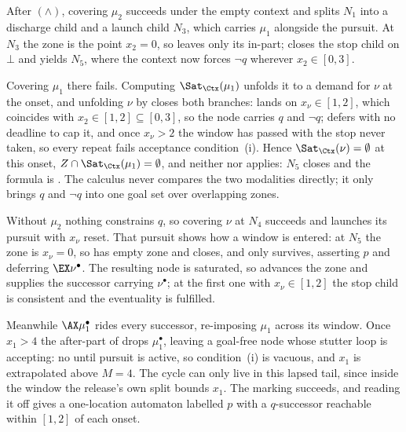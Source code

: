 \begin{example}[$\mu_1\wedge\mu_2$]\label{ex:unsat}
After $(\wedge)$, covering $\mu_2$ succeeds under the empty context and splits $N_1$
into a discharge child and a launch child $N_3$, which carries $\mu_1$ alongside the
pursuit. At $N_3$ the zone is the point $x_2{=}0$, so  leaves only its
in-part;  closes the stop child on $\bot$ and yields $N_5$, where the
context now forces $\neg q$ wherever $x_2\in[0,3]$.

Covering $\mu_1$ there fails. Computing $\Sat_\Ctx(\mu_1)$ unfolds it to a demand for
$\nu$ at the onset, and unfolding $\nu$ by  closes both branches:
 lands on $x_\nu\in[1,2]$, which coincides with $x_2\in[1,2]\subseteq[0,3]$,
so the node carries $q$ and $\neg q$;  defers with no deadline to cap it, and
once $x_\nu>2$ the window has passed with the stop never taken, so every repeat fails
acceptance condition~(i). Hence $\Sat_\Ctx(\nu)=\emptyset$ at this onset,
$Z\cap\Sat_\Ctx(\mu_1)=\emptyset$, and neither  nor  applies:
$N_5$ closes and the formula is \UNSAT. The calculus never compares the two modalities
directly; it only brings $q$ and $\neg q$ into one goal set over overlapping zones.
\end{example}

\begin{example}[$\mu_1$ alone]\label{ex:sat}
Without $\mu_2$ nothing constrains $q$, so covering $\nu$ at $N_4$ succeeds and launches
its pursuit with $x_\nu$ reset. That pursuit shows how a window is entered: at $N_5$ the
zone is $x_\nu{=}0$, so  has empty zone and closes, and only 
survives, asserting $p$ and deferring $\EX\nu^\bullet$. The resulting node is saturated,
so  advances the zone and  supplies the successor carrying
$\nu^\bullet$; at the first one with $x_\nu\in[1,2]$ the stop child is consistent and the
eventuality is fulfilled.

Meanwhile $\AX\mu_1^\bullet$ rides every successor, re-imposing $\mu_1$ across its window.
Once $x_1>4$ the after-part of  drops $\mu_1^\bullet$, leaving a goal-free
node whose stutter loop is accepting: no until pursuit is active, so condition~(i) is
vacuous, and $x_1$ is extrapolated above $M{=}4$. The cycle can only live in this lapsed
tail, since inside the window the release's own split bounds $x_1$. The marking succeeds,
and reading it off gives a one-location automaton labelled $p$ with a $q$-successor
reachable within $[1,2]$ of each onset.
\end{example}